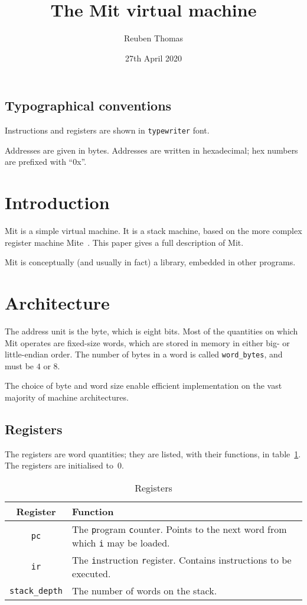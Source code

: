 \documentclass[a4paper]{article}
\title{The Mit virtual machine}
\author{Reuben Thomas}
\date{27th April 2020}
\begin{document}
\maketitle

\subsection*{Typographical conventions}

Instructions and registers are shown in {\tt typewriter} font.

Addresses are given in bytes. Addresses are written in hexadecimal; hex numbers are prefixed with “0x”.


\section{Introduction}

Mit is a simple virtual machine. It is a stack machine, based on the more complex register machine Mite~\cite{mite0}.
This paper gives a full description of Mit.

Mit is conceptually (and usually in fact) a library, embedded in other programs.


\section{Architecture}

The address unit is the byte, which is eight bits.
Most of the quantities on which Mit operates are fixed-size words, which are stored in memory in either big- or little-endian order. The number of bytes in a word is called {\tt word\_bytes}, and must be $4$ or $8$.

The choice of byte and word size enable efficient implementation on the vast majority of machine architectures.


\subsection{Registers}
\label{registers}

The registers are word quantities; they are listed, with their functions, in table~\ref{regtable}. The registers are initialised to~$0$.

\begin{table}[htbp]
\begin{center}
\begin{tabular}{cp{3.75in}} \toprule
\bf Register & \bf Function \\
 \midrule
{\tt pc} & The {\tt p}rogram {\tt c}ounter. Points to the next word from which {\tt i} may be loaded. \\
{\tt ir} & The {\tt i}nstruction {\tt r}egister. Contains instructions to be executed. \\
{\tt stack\_depth} & The number of words on the stack. \\
 \bottomrule
\end{tabular}
\caption{\label{regtable}Registers}
\end{center}
\end{table}
\end{document}
